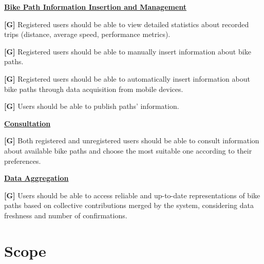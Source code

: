     \uline{\textbf{Bike Path Information Insertion and Management}}
    
        \textbf{[G\cg]} Registered users should be able to view detailed statistics about recorded trips (distance, average speed, performance metrics).

        \textbf{[G\cg]}  Registered users should be able to manually insert information about bike paths.

        \textbf{[G\cg]}  Registered users should be able to automatically insert information about bike paths through data acquisition from mobile devices.


        \textbf{[G\cg]}  Users should be able to publish paths' information. %

    \uline{\textbf{Consultation}}
    
        \textbf{[G\cg]} Both registered and unregistered users should be able to consult information about available bike paths and choose the most suitable one according to their preferences.

    \uline{\textbf{Data Aggregation}}

        \textbf{[G\cg]}  Users should be able to access reliable and up-to-date representations of bike paths based on collective contributions merged by the system, considering data freshness and number of confirmations. %






\section{Scope}
\label{subsec:scope}%

